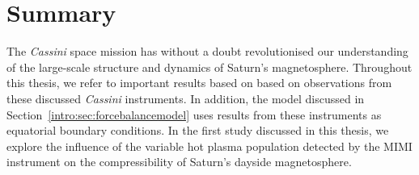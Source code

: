 \section{Summary}
The \textit{Cassini} space mission has without a doubt revolutionised our understanding of the large-scale structure and dynamics of Saturn's magnetosphere. Throughout this thesis, we refer to important results based on based on observations from these discussed \textit{Cassini} instruments. In addition, the \citet{achilleos2010a} model discussed in Section~\ref{intro:sec:forcebalancemodel} uses results from these instruments as equatorial boundary conditions. In the first study discussed in this thesis, we explore the influence of the variable hot plasma population detected by the MIMI instrument on the compressibility of Saturn's dayside magnetosphere.